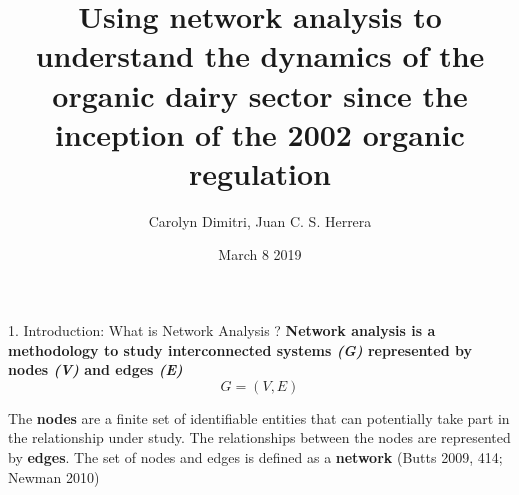 \documentclass[20]{beamer}
\title[University of Connecticut ARE Seminars]{Using network analysis to understand the dynamics of the organic dairy sector since the inception of the 2002 organic regulation}
\author{Carolyn Dimitri, Juan C. S. Herrera}
\date{March 8 2019}
\begin{document}
\begin{frame}
  \titlepage
\end{frame}


\begin{frame}{1. Introduction: What is Network Analysis ?}
\justify
\textbf{Network analysis is a methodology to study interconnected systems \textit{(G)} represented by nodes \textit{(V)} and edges  \textit{(E)}}
\\ 
\[G = (V, E)\]

The \textbf{nodes} are a finite set of identifiable entities that can potentially take part in the relationship under study. The relationships between the nodes are represented by \textbf{edges}. The set of nodes and edges is defined as a \textbf{network} (Butts 2009, 414; Newman 2010)

\end{frame}
\end{document}
